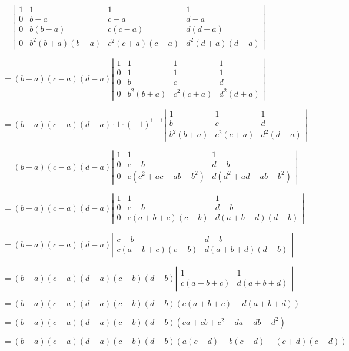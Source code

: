 \documentclass[UTF8, 12pt]{ctexart}
\begin{document}
$=\left|\begin{array}{cccc} 
    1 & 1 & 1 & 1 \\
    0 & b-a & c-a & d-a \\
    0 & b(b-a) & c(c-a) & d(d-a) \\
    0 & b^2(b+a)(b-a) & c^2(c+a)(c-a) & d^2(d+a)(d-a)
\end{array}\right|$

$=(b-a)(c-a)(d-a)\left|\begin{array}{cccc} 
    1 & 1 & 1 & 1 \\
    0 & 1 & 1 & 1 \\
    0 & b & c & d \\
    0 & b^2(b+a) & c^2(c+a) & d^2(d+a)
\end{array}\right|$

$=(b-a)(c-a)(d-a)\cdot 1\cdot(-1)^{1+1}\left|\begin{array}{ccc}
    1 & 1 & 1 \\
    b & c & d \\
    b^2(b+a) & c^2(c+a) & d^2(d+a)
\end{array}\right|$

$=(b-a)(c-a)(d-a)\left|\begin{array}{ccc}
    1 & 1 & 1 \\
    0 & c-b & d-b \\
    0 & c(c^2+ac-ab-b^2) & d(d^2+ad-ab-b^2)
\end{array}\right|$

$=(b-a)(c-a)(d-a)\left|\begin{array}{ccc}
    1 & 1 & 1 \\
    0 & c-b & d-b \\
    0 & c(a+b+c)(c-b) & d(a+b+d)(d-b)
\end{array}\right|$

$=(b-a)(c-a)(d-a)\left|\begin{array}{cc}
    c-b & d-b \\
    c(a+b+c)(c-b) & d(a+b+d)(d-b)
\end{array}\right|$

$=(b-a)(c-a)(d-a)(c-b)(d-b)\left|\begin{array}{cc}
    1 & 1 \\
    c(a+b+c) & d(a+b+d)
\end{array}\right|$

$=(b-a)(c-a)(d-a)(c-b)(d-b)(c(a+b+c)-d(a+b+d))$

$=(b-a)(c-a)(d-a)(c-b)(d-b)(ca+cb+c^2-da-db-d^2)$

$=(b-a)(c-a)(d-a)(c-b)(d-b)(a(c-d)+b(c-d)+(c+d)(c-d))$
\end{document}
